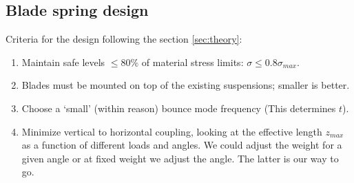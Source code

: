 \subsection{Blade spring design}

Criteria for the design following the section \ref{sec:theory}:

\begin{enumerate}
	\item Maintain safe levels $\leq 80\%$ of material stress limits:
	$\sigma\leq0.8\sigma_{max}$.
	\item Blades must be mounted on top of the existing suspensions; smaller is better. 
  \item Choose a `small' (within reason) bounce mode frequency (This determines $t$). 
	\item Minimize vertical to horizontal coupling, looking at the effective length $z_{max}$ as a function of different loads and angles. We could adjust the weight for a given angle or at fixed weight we adjust the angle. The latter is our way to go.
	
\end{enumerate}


